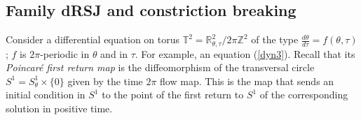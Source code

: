 \documentclass[preprint,12pt]{elsarticle}
\theoremstyle{plain}
\numberwithin{equation}{section}
\numberwithin{equation}{section}
\begin{document}
\subsection{Family dRSJ and constriction breaking}\label{subsec:dRSJ-family}

Consider a differential equation on torus $\mathbb T^2=\mathbb R^2_{\theta,\tau}\slash2\pi\mathbb Z^2$ 
of the type $\frac{d\theta}{d\tau}=f(\theta,\tau)$; $f$ is $2\pi$-periodic in $\theta$ and in $\tau$. For example, 
an equation (\ref{dyn3}). Recall that its {\it Poincar\'e first return map} is the diffeomorphism of the transversal circle $S^1=S^1_{\theta}\times\{0\}$ given by the 
time $2\pi$ flow map. This is the map that sends an initial condition in $S^1$ to the point of the first return  to $S^1$ of the corresponding solution in positive time. 
\end{document}
